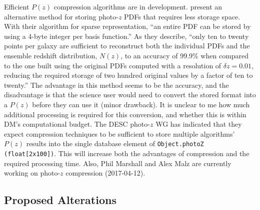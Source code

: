 \documentclass[DM,lsstdraft,toc]{lsstdoc}
\begin{document}
Efficient $P(z)$ compression algorithms are in development. \cite{2014MNRAS.441.3550C} present an alternative method for storing photo-$z$ PDFs that requires less storage space. With their algorithm for sparse representation, ``an entire PDF can be stored by using a 4-byte integer per basis function.'' As they describe, ``only ten to twenty points per galaxy are sufficient to reconstruct both the individual PDFs and the ensemble redshift distribution, $N(z)$, to an accuracy of 99.9\% when compared to the one built using the original PDFs computed with a resolution of $\delta z = 0.01$, reducing the required storage of two hundred original values by a factor of ten to twenty.'' The advantage in this method seems to be the accuracy, and the disadvantage is that the science user would need to convert the stored format into a $P(z)$ before they can use it (minor drawback). It is unclear to me how much additional processing is required for this conversion, and whether this is within DM's computational budget. The DESC photo-$z$ WG has indicated that they expect compression techniques to be sufficient to store multiple algorithms' $P(z)$ results into the single database element of \texttt{Object.photoZ (float[2x100])}. This will increase both the advantages of compression and the required processing time. Also, Phil Marshall and Alex Malz are currently working on photo-$z$ compression (2017-04-12).

\subsection{Proposed Alterations}\label{ssec:format_summary}
\end{document}
